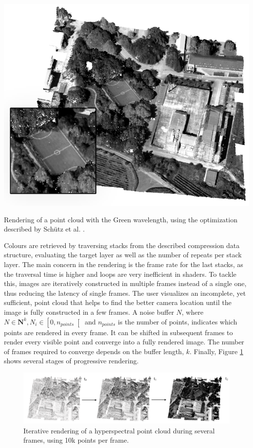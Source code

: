 \begin{marginfigure}[.cm]
    \centering
    \includegraphics[width=\linewidth]{figs/hyper_point_cloud/hqs_optimization.png}
	\caption{Rendering of a point cloud with the Green wavelength, using the optimization described by Schütz et al. \cite{schutz_rendering_2021}. }
	\label{fig:hyper_hqs_optimization}
\end{marginfigure}
Colours are retrieved by traversing stacks from the described compression data structure, evaluating the target layer as well as the number of repeats per stack layer. The main concern in the rendering is the frame rate for the last stacks, as the traversal time is higher and loops are very inefficient in shaders. To tackle this, images are iteratively constructed in multiple frames instead of a single one, thus reducing the latency of single frames. The user visualizes an incomplete, yet sufficient, point cloud that helps to find the better camera location until the image is fully constructed in a few frames. A noise buffer $N$, where $N \in \mathbf{N}^k, N_i \in \left[0, n_{\textit{points}}\right[$ and $n_{\textit{points}}$ is the number of points, indicates which points are rendered in every frame. It can be shifted in subsequent frames to render every visible point and converge into a fully rendered image. The number of frames required to converge depends on the buffer length, $k$. Finally, Figure \ref{fig:hyper_iterative_rendering} shows several stages of progressive rendering.

\begin{figure}[ht]
    \centering
    \includegraphics[width=\linewidth]{figs/hyper_point_cloud/iterative_rendering.png}
	\caption{Iterative rendering of a hyperspectral point cloud during several frames, using 10k points per frame.}
	\label{fig:hyper_iterative_rendering}
\end{figure}

